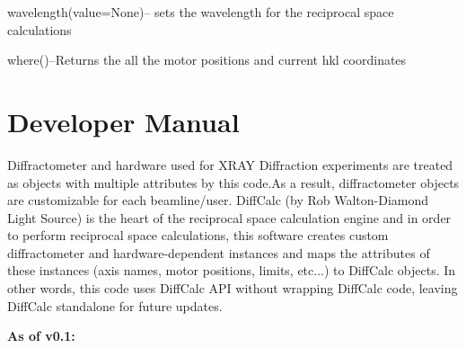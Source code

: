 \documentclass[letterpaper,10pt,english]{sphinxmanual}
\begin{document}

\begin{fulllineitems}
\label{Manual:commands.wavelength}
wavelength(value=None)-- sets the wavelength for the reciprocal space calculations

\end{fulllineitems}


\begin{fulllineitems}
\label{Manual:commands.where}
where()--Returns the all the motor positions and current hkl coordinates

\end{fulllineitems}



\chapter{Developer Manual}
\label{Manual:developer-manual}\label{Manual:module-Diffractometer}
Diffractometer and hardware used for XRAY Diffraction experiments are treated as objects with multiple attributes by this code.As a result, diffractometer objects are customizable for each beamline/user. DiffCalc (by Rob Walton-Diamond Light Source) is the heart of the reciprocal space calculation engine and in order to perform reciprocal space calculations, this software creates custom diffractometer and hardware-dependent instances and maps the attributes of these instances (axis names, motor positions, limits, etc...) to DiffCalc objects. In other words, this code uses DiffCalc API without wrapping DiffCalc code, leaving DiffCalc standalone for future updates.

\textbf{As of v0.1:}
\end{document}
